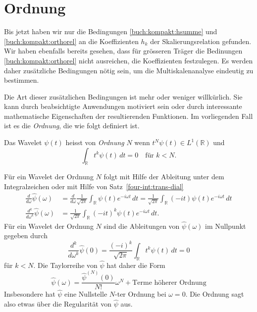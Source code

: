 %
%
%
\section{Ordnung\label{section:ordnung}}
Bis jetzt haben wir nur die Bedingungen \eqref{buch:kompakt:hsumme}
und \eqref{buch:kompakt:orthorel} an die Koeffizienten 
$h_k$ der Skalierungsrelation gefunden.
Wir haben ebenfalls bereits gesehen, dass für grösseren Träger die
Bedinungen \eqref{buch:kompakt:orthorel} nicht ausreichen, die
Koeffizienten festzulegen.
Es werden daher zusätzliche Bedingungen nötig sein, um die
Multiskalenanalyse eindeutig zu bestimmen.

Die Art dieser zusätzlichen Bedingungen ist mehr oder weniger willkürlich.
Sie kann durch beabsichtigte Anwendungen motiviert sein oder durch
interessante mathematische Eigenschaften der resultierenden Funktionen.
Im vorliegenden Fall ist es die {\em Ordnung}, die wie folgt definiert ist.

\begin{definition}
\label{kompakt:ordnung:definition}
%
Das Wavelet $\psi(t)$ heisst von {\em Ordnung} $N$ wenn
$t^N\psi(t)\in L^1(\mathbb R)$ und
\begin{equation}
\int_{\mathbb R} t^k\psi(t)\,dt=0\quad \text{für $k<N$.}
\label{kompakt:ordnung:formel}
\end{equation}
\label{definition:ordnung}
\end{definition}

Für ein Wavelet der Ordnung $N$ folgt mit Hilfe der Ableitung unter
dem Integralzeichen oder mit Hilfe von Satz~\ref{four-int:trans-dial}
\begin{align*}
\frac{d}{d\omega}
\hat{\psi}(\omega)
&=
\frac{d}{d\omega}
\frac{1}{\sqrt{2\pi}}
\int_{\mathbb R}
\psi(t) e^{-i\omega t}\,dt
=
\frac{1}{\sqrt{2\pi}}
\int_{\mathbb R}
(-it)
\psi(t) e^{-i\omega t}\,dt
\\
\frac{d^k}{d\omega^k}
\hat{\psi}(\omega)
&=
\frac{1}{\sqrt{2\pi}}
\int_{\mathbb R}
(-it)^k
\psi(t) e^{-i\omega t}\,dt.
\end{align*}
Für ein Wavelet der Ordnung $N$ sind die Ableitungen von $\hat{\psi}(\omega)$
im Nullpunkt gegeben durch
\[
\frac{d^k}{d\omega^k}
\hat{\psi}(0)
=
\frac{(-i)^k}{\sqrt{2\pi}}
\int_{\mathbb R} t^k \psi(t) \,dt = 0
\]
für $k<N$. 
Die Taylorreihe von $\hat{\psi}$ hat daher die Form
\[
\hat{\psi}(\omega)
=
\frac{\hat{\psi}^{(N)}(0)}{N!} \omega^N + \text{Terme höherer Ordnung}
\]
Insbesondere hat $\hat{\psi}$ eine Nullstelle $N$-ter Ordnung bei $\omega=0$.
Die Ordnung sagt also etwas über die Regularität von $\hat{\psi}$ aus.

